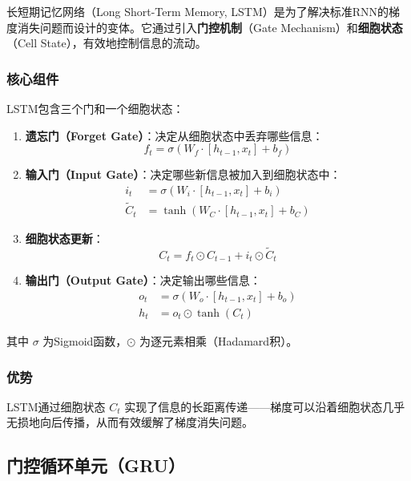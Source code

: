 \documentclass[12pt, a4paper]{ctexart}
\begin{document}
长短期记忆网络（Long Short-Term Memory, LSTM）是为了解决标准RNN的梯度消失问题而设计的变体。它通过引入\textbf{门控机制}（Gate Mechanism）和\textbf{细胞状态}（Cell State），有效地控制信息的流动。

\subsubsection{核心组件}

LSTM包含三个门和一个细胞状态：

\begin{enumerate}
    \item \textbf{遗忘门（Forget Gate）}：决定从细胞状态中丢弃哪些信息：
    \begin{equation}
        f_t = \sigma(W_f \cdot [h_{t-1}, x_t] + b_f)
    \end{equation}

    \item \textbf{输入门（Input Gate）}：决定哪些新信息被加入到细胞状态中：
    \begin{align}
        i_t &= \sigma(W_i \cdot [h_{t-1}, x_t] + b_i) \\
        \tilde{C}_t &= \tanh(W_C \cdot [h_{t-1}, x_t] + b_C)
    \end{align}

    \item \textbf{细胞状态更新}：
    \begin{equation}
        C_t = f_t \odot C_{t-1} + i_t \odot \tilde{C}_t
    \end{equation}

    \item \textbf{输出门（Output Gate）}：决定输出哪些信息：
    \begin{align}
        o_t &= \sigma(W_o \cdot [h_{t-1}, x_t] + b_o) \\
        h_t &= o_t \odot \tanh(C_t)
    \end{align}
\end{enumerate}

其中 $\sigma$ 为Sigmoid函数，$\odot$ 为逐元素相乘（Hadamard积）。

\subsubsection{优势}

LSTM通过细胞状态 $C_t$ 实现了信息的长距离传递——梯度可以沿着细胞状态几乎无损地向后传播，从而有效缓解了梯度消失问题。

\subsection{门控循环单元（GRU）}
\end{document}
